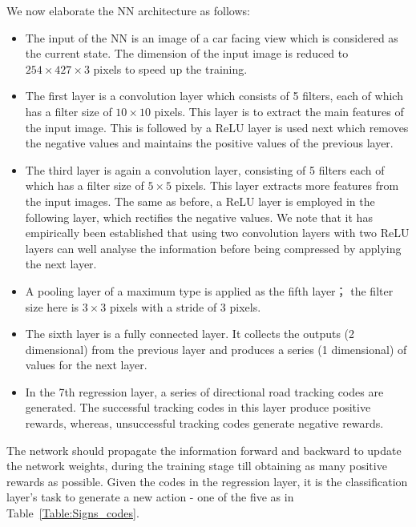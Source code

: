 \documentclass{svproc}
\begin{document}
We now elaborate the NN architecture as follows:
\begin{itemize}
\item The input of the NN is an image of a car facing view which is considered as the current state. The dimension of the input image is reduced to $254 \times 427 \times 3$ pixels to speed up the training. 

\item The first layer is a convolution layer which consists of 5 filters, each of which has a filter size of $10 \times 10$ pixels. This layer is to extract the main features of the input image. 
This is followed by a ReLU layer is used next which removes the negative values and maintains the positive values of the previous layer. 

\item The third layer is again a convolution layer, consisting of 5 filters each of which has a filter size of $5 \times 5$ pixels. This layer extracts more features from the input images. The same as before, a ReLU layer is employed in the following layer, which rectifies the negative values. We note that it has empirically been established that using two convolution layers with two ReLU layers can well analyse the information before being compressed by applying the next layer. 

\item A pooling layer of a maximum type is applied as the fifth layer； the filter size here is $3 \times 3$ pixels with a stride of 3 pixels. 

\item The sixth layer is a fully connected layer. It collects the outputs (2 dimensional) from the previous layer and produces a series (1 dimensional) of values for the next layer. 

\item In the 7th regression layer, a series of directional road tracking codes are generated. The successful tracking codes in this layer produce positive rewards, whereas, unsuccessful tracking codes generate negative rewards. 
\end{itemize}

The network should propagate the information forward and backward to update the network weights, during the training stage till obtaining as many positive rewards as possible. Given the codes in the regression layer, it is the classification layer's task to generate a new action - one of the five as in Table~\ref{Table:Signs_codes}. 
\end{document}
